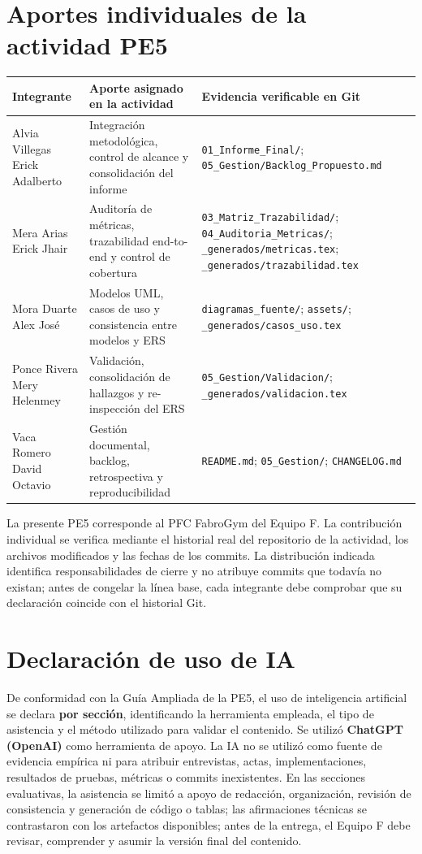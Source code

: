\documentclass[11pt,a4paper]{article}
\begin{document}
\section{Aportes individuales de la actividad PE5}
\begin{longtable}{|p{4cm}|p{6.2cm}|p{4.3cm}|}\hline
\textbf{Integrante} & \textbf{Aporte asignado en la actividad} & \textbf{Evidencia verificable en Git}\\\hline
Alvia Villegas Erick Adalberto & Integración metodológica, control de alcance y consolidación del informe & \texttt{01\_Informe\_Final/}; \texttt{05\_Gestion/Backlog\_Propuesto.md} \\ \hline
Mera Arias Erick Jhair & Auditoría de métricas, trazabilidad end-to-end y control de cobertura & \texttt{03\_Matriz\_Trazabilidad/}; \texttt{04\_Auditoria\_Metricas/}; \texttt{\_generados/metricas.tex}; \texttt{\_generados/trazabilidad.tex} \\ \hline
Mora Duarte Alex José & Modelos UML, casos de uso y consistencia entre modelos y ERS & \texttt{diagramas\_fuente/}; \texttt{assets/}; \texttt{\_generados/casos\_uso.tex} \\ \hline
Ponce Rivera Mery Helenmey & Validación, consolidación de hallazgos y re-inspección del ERS & \texttt{05\_Gestion/Validacion/}; \texttt{\_generados/validacion.tex} \\ \hline
Vaca Romero David Octavio & Gestión documental, backlog, retrospectiva y reproducibilidad & \texttt{README.md}; \texttt{05\_Gestion/}; \texttt{CHANGELOG.md} \\ \hline
\end{longtable}
La presente PE5 corresponde al PFC FabroGym del Equipo F. La contribución individual se verifica mediante el historial real del repositorio de la actividad, los archivos modificados y las fechas de los commits. La distribución indicada identifica responsabilidades de cierre y no atribuye commits que todavía no existan; antes de congelar la línea base, cada integrante debe comprobar que su declaración coincide con el historial Git.

\section{Declaración de uso de IA}
De conformidad con la Guía Ampliada de la PE5, el uso de inteligencia artificial se declara \textbf{por sección}, identificando la herramienta empleada, el tipo de asistencia y el método utilizado para validar el contenido. Se utilizó \textbf{ChatGPT (OpenAI)} como herramienta de apoyo. La IA no se utilizó como fuente de evidencia empírica ni para atribuir entrevistas, actas, implementaciones, resultados de pruebas, métricas o commits inexistentes. En las secciones evaluativas, la asistencia se limitó a apoyo de redacción, organización, revisión de consistencia y generación de código o tablas; las afirmaciones técnicas se contrastaron con los artefactos disponibles; antes de la entrega, el Equipo F debe revisar, comprender y asumir la versión final del contenido.
\end{document}
